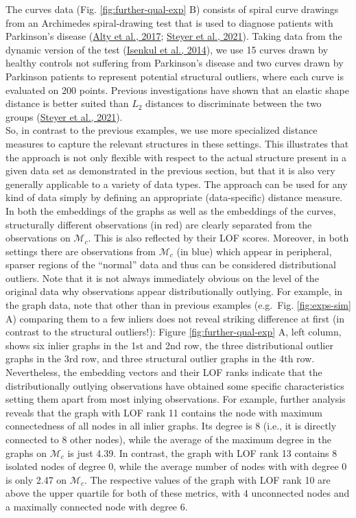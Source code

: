 \documentclass[
  10pt]{article}
\newcommand{\co}{c}
\newcommand{\Min}{\mathcal{M}_{\co}}
\begin{document}
The curves data (Fig. \ref{fig:further-qual-exp} B) consists of spiral curve drawings from an Archimedes spiral-drawing test that is used to diagnose patients with Parkinson's disease (\protect\hyperlink{ref-alty2017use}{Alty et al., 2017}; \protect\hyperlink{ref-steyer2021elastic}{Steyer et al., 2021}). Taking data from the dynamic version of the test (\protect\hyperlink{ref-isenkul2014improved}{Isenkul et al., 2014}), we use 15 curves drawn by healthy controls not suffering from Parkinson's disease and two curves drawn by Parkinson patients to represent potential structural outliers, where each curve is evaluated on 200 points. Previous investigations have shown that an elastic shape distance is better suited than \(L_2\) distances to discriminate between the two groups (\protect\hyperlink{ref-steyer2021elastic}{Steyer et al., 2021}).\\
So, in contrast to the previous examples, we use more specialized distance measures to capture the relevant structures in these settings. This illustrates that the approach is not only flexible with respect to the actual structure present in a given data set as demonstrated in the previous section, but that it is also very generally applicable to a variety of data types. The approach can be used for any kind of data simply by defining an appropriate (data-specific) distance measure.
In both the embeddings of the graphs as well as the embeddings of the curves, structurally different observations (in red) are clearly separated from the observations on \(\Min\). This is also reflected by their LOF scores. Moreover, in both settings there are observations from \(\Min\) (in blue) which appear in peripheral, sparser regions of the ``normal'' data and thus can be considered distributional outliers.
Note that it is not always immediately obvious on the level of the original data why observations appear distributionally outlying. For example, in the graph data, note that other than in previous examples (e.g.~Fig. \ref{fig:exps-sim} A) comparing them to a few inliers does not reveal striking difference at first (in contrast to the structural outliers!): Figure \ref{fig:further-qual-exp} A, left column, shows six inlier graphs in the 1st and 2nd row, the three distributional outlier graphs in the 3rd row, and three structural outlier graphs in the 4th row.\\
Nevertheless, the embedding vectors and their LOF ranks indicate that the distributionally outlying observations have obtained some specific characteristics setting them apart from most inlying observations. For example, further analysis reveals that the graph with LOF rank 11 contains the node with maximum connectedness of all nodes in all inlier graphs. Its degree is 8 (i.e., it is directly connected to 8 other nodes), while the average of the maximum degree in the graphs on \(\Min\) is just 4.39. In contrast, the graph with LOF rank 13 contains 8 isolated nodes of degree 0, while the average number of nodes with with degree 0 is only 2.47 on \(\Min\). The respective values of the graph with LOF rank 10 are above the upper quartile for both of these metrics, with 4 unconnected nodes and a maximally connected node with degree 6.
\end{document}
